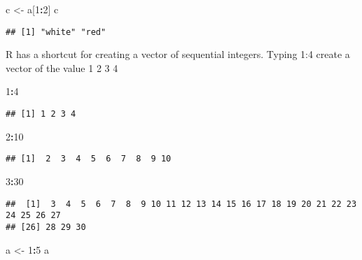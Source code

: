 \documentclass[
]{article}
\newenvironment{Shaded}{\begin{snugshade}}{\end{snugshade}}
\newcommand{\DecValTok}[1]{\textcolor[rgb]{0.00,0.00,0.81}{#1}}
\newcommand{\NormalTok}[1]{#1}
\newcommand{\OperatorTok}[1]{\textcolor[rgb]{0.81,0.36,0.00}{\textbf{#1}}}
\newcommand{\StringTok}[1]{\textcolor[rgb]{0.31,0.60,0.02}{#1}}
\begin{document}
\begin{Shaded}
\begin{Highlighting}[]
\NormalTok{c <-}\StringTok{ }\NormalTok{a[}\DecValTok{1}\OperatorTok{:}\DecValTok{2}\NormalTok{]}
\NormalTok{c}
\end{Highlighting}
\end{Shaded}

\begin{verbatim}
## [1] "white" "red"
\end{verbatim}

R has a shortcut for creating a vector of sequential integers. Typing
1:4 create a vector of the value 1 2 3 4

\begin{Shaded}
\begin{Highlighting}[]
\DecValTok{1}\OperatorTok{:}\DecValTok{4}
\end{Highlighting}
\end{Shaded}

\begin{verbatim}
## [1] 1 2 3 4
\end{verbatim}

\begin{Shaded}
\begin{Highlighting}[]
\DecValTok{2}\OperatorTok{:}\DecValTok{10}
\end{Highlighting}
\end{Shaded}

\begin{verbatim}
## [1]  2  3  4  5  6  7  8  9 10
\end{verbatim}

\begin{Shaded}
\begin{Highlighting}[]
\DecValTok{3}\OperatorTok{:}\DecValTok{30}
\end{Highlighting}
\end{Shaded}

\begin{verbatim}
##  [1]  3  4  5  6  7  8  9 10 11 12 13 14 15 16 17 18 19 20 21 22 23 24 25 26 27
## [26] 28 29 30
\end{verbatim}

\begin{Shaded}
\begin{Highlighting}[]
\NormalTok{a <-}\StringTok{ }\DecValTok{1}\OperatorTok{:}\DecValTok{5}
\NormalTok{a}
\end{Highlighting}
\end{Shaded}
\end{document}
